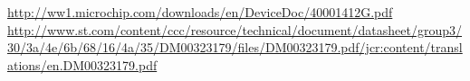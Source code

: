 \begin{thebibliography}{99}
\label{sec:ref}



	\url{http://ww1.microchip.com/downloads/en/DeviceDoc/40001412G.pdf}
	\url{http://www.st.com/content/ccc/resource/technical/document/datasheet/group3/30/3a/4e/6b/68/16/4a/35/DM00323179/files/DM00323179.pdf/jcr:content/translations/en.DM00323179.pdf}

\begin{comment}


\bibitem{cad}
	\url{https://www.autodesk.com/products/fusion-360/overview}
\bibitem{wind_meas}
	\url{ltu.diva-portal.org/smash/get/diva2:1039147/FULLTEXT01.pdf}
\bibitem{load_cell}
	\url{http://www.te.com/commerce/DocumentDelivery/DDEController?Action=srchrtrv&DocNm=FX19&DocType=DS&DocLang=English}
\bibitem{webpage}
	\url{http://www.lygte-info.dk/info/battery\%20protection\%20UK.html}


\bibitem{lm1117}
	KiCad library entry for voltage regulator component lm1117 by \emph{ObKo}, 2012,
	\url{https://github.com/ObKo/kicad-libraries/blob/master/libraries/lm1117.lib}.
\bibitem{overprotection}
	Overvoltage and Reverce-voltage Protection in Automotive Systems,
	Application note 760, \emph{Maxim integrated}, Apr 02, 2002, 
	\url{https://www.maximintegrated.com/en/app-notes/index.mvp/id/760}.
\bibitem{Tof_cover}
	\gls{st}, Application note: AN4907, \emph{VL53L0X ranging module cover window guidelines},
	\url{http://www.st.com/content/ccc/resource/technical/document/application_note/group0/9d/93/be/33/13/be/46/19/DM00326504/files/DM00326504.pdf/jcr:content/translations/en.DM00326504.pdf}
\bibitem{kf eff}
	Duygun, M., Kutlu, L. \& Sickles, R.C., Journal of Productivity Analysis, 2016, 46: 155, \url{https://doi.org/10.1007/s11123-016-0477-z}
\bibitem{cle}
	Class E RF Amplifier Theory of Operation
	\url{http://www.classeradio.com/theory.htm}.


\bibitem{cccv}
	Power Guy, \emph{Constant Current Constant voltage}, May 26, 2016, San Diego, USA,
	\url{https://www.us.tdk-lambda.com/media/292143/tdk-lambda-blog-052616.pdf}.


\end{comment}
\end{thebibliography}
